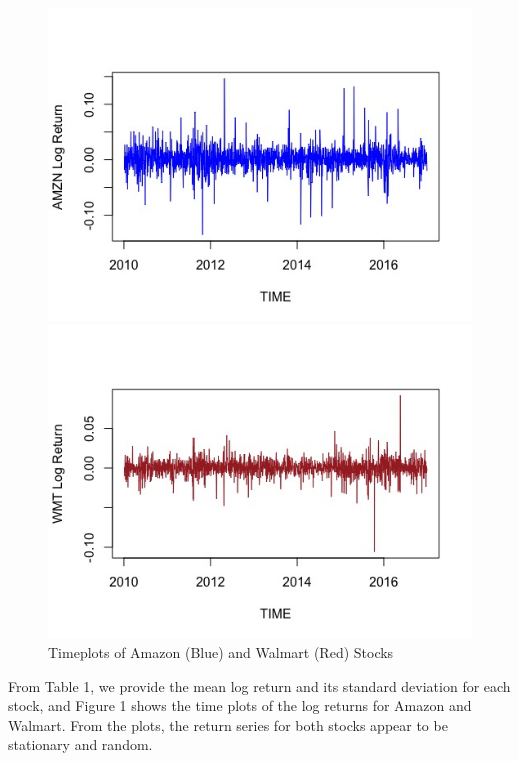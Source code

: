 \documentclass[paper=a4, fontsize=13pt]{article}
\begin{document}
\begin{figure}[!htbp]
\begin{minipage}[!htbp]{0.5\linewidth}
\centering
\includegraphics[scale = 0.45]{img/timeplot_AMZN}
\end{minipage}
\begin{minipage}[!htbp]{0.5\linewidth}
\centering
\includegraphics[scale = 0.45]{img/timeplot_WMT}
\end{minipage}
\caption{Timeplots of Amazon (Blue) and Walmart (Red) Stocks}
\label{tp}
\end{figure}

From Table 1, we provide the mean log return and its standard deviation for each stock, and Figure 1 shows the time plots of the log returns for Amazon and Walmart. From the plots, the return series for both stocks appear to be stationary and random.
\end{document}
